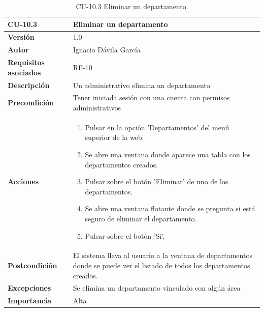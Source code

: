 \begin{table}[p]
	\centering
	\begin{tabularx}{\linewidth}{ p{} p{} }
		\toprule
		\textbf{CU-10.3}    & \textbf{Eliminar un departamento}\\
		\toprule
		\textbf{Versión}              & 1.0    \\
		\textbf{Autor}                & Ignacio Dávila García \\
		\textbf{Requisitos asociados} & RF-10 \\
		\textbf{Descripción}          & Un administrativo elimina un departamento \\
		\textbf{Precondición}         & Tener iniciada sesión con una cuenta con permisos administrativos \\
		\textbf{Acciones}             &
		\begin{enumerate}
			\def\labelenumi{\arabic{enumi}.}
			\tightlist
			\item Pulsar en la opción 'Departamentos' del menú superior de la web.
			\item Se abre una ventana donde aparece una tabla con los departamentos creados.
			\item Pulsar sobre el botón 'Eliminar' de uno de los departamentos.
			\item Se abre una ventana flotante donde se pregunta si está seguro de eliminar el departamento.
			\item Pulsar sobre el botón 'Sí'.
		\end{enumerate}\\
		\textbf{Postcondición}        & El sistema lleva al usuario a la ventana de departamentos donde se puede ver el listado de todos los departamentos creados. \\
		\textbf{Excepciones}          & Se elimina un departamento vinculado con algún área \\
		\textbf{Importancia}          & Alta \\
		\bottomrule
	\end{tabularx}
	\caption{CU-10.3 Eliminar un departamento.}
\end{table}

